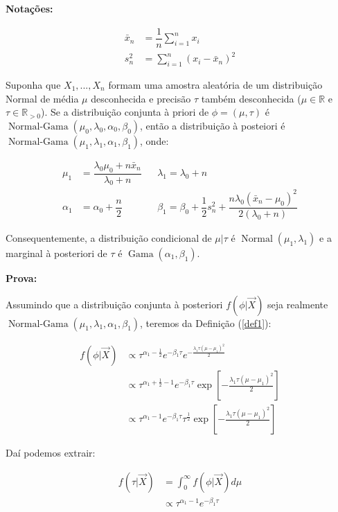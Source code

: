 \documentclass[a4paper]{article}
\newcommand{\op}[1]{{\operatorname{#1}}}
\newcommand{\vX}{\vec X}
\newcommand{\xn}{\bar{x}_n}
\newcommand{\sn}{s^2_n}
\begin{document}
\textbf{Notações:}

\begin{align*}
\xn&=\dfrac{1}{n}\sum_{i=1}^{n}x_i\\
\sn&=\sum_{i=1}^{n}(x_i-\xn)^2
\end{align*}
\begin{theorem}
	\label{theo1}
	\citep{degroot2012probability}
	Suponha que $X_1,. . . ,X_n$ formam uma amostra aleatória de um distribuição Normal de média $\mu$ desconhecida e precisão $\tau$ também desconhecida ($\mu\in\mathbb{R}$ e $\tau\in\mathbb{R}_{>0}$). Se a distribuição conjunta à priori de $\phi=(\mu,\tau)$ é $\op{Normal-Gama}(\mu_0,\lambda_0,\alpha_0,\beta_0)$, então a distribuição à posteiori é $\op{Normal-Gama}(\mu_1,\lambda_1,\alpha_1,\beta_1)$, onde:
	
	\begin{align*}
	\mu_1&=\dfrac{\lambda_0\mu_0+n\xn}{\lambda_0+n}&&\lambda_1=\lambda_0+n\\
	\alpha_1&=\alpha_0+\dfrac n 2&&\beta_1=\beta_0+\dfrac12\sn+\dfrac{n\lambda_0(\xn-\mu_0)^2}{2(\lambda_0+n)}
	\end{align*}
	
	Consequentemente, a distribuição condicional de $\mu|\tau$ é $\op{Normal}(\mu_1,\lambda_1)$ e a marginal à posteriori de $\tau$ é $\op{Gama}(\alpha_1,\beta_1)$.
\end{theorem}

\textbf{Prova:}

Assumindo que a distribuição conjunta à posteriori $f(\phi|\vX)$ seja realmente $\op{Normal-Gama}(\mu_1,\lambda_1,\alpha_1,\beta_1)$, teremos da Definição (\ref{def1}):

\begin{align*}f(\phi|\vX)&\displaystyle\propto\tau^{\alpha_1-\frac12}e^{-\beta_1\tau}e^{-\frac{\lambda_1\tau (\mu-\mu_1)^2}2}\\
&\propto \tau^{\alpha_1+\frac12-1}e^{-\beta_1\tau}\exp{\left[-\frac{\lambda_1\tau (\mu-\mu_1)^2}2\right]}\\
&\propto\tau^{\alpha_1-1}e^{-\beta_1\tau}\tau^{\frac12}\exp{\left[-\frac{\lambda_1\tau (\mu-\mu_1)^2}2\right]}
\end{align*}

Daí podemos extrair:

\begin{align}
	f(\tau|\vX)&=\displaystyle\int_0^{\infty}f(\phi|\vX)d\mu\nonumber\\
	&\propto \tau^{\alpha_1-1}e^{-\beta_1\tau}\label{marg_tau}
\end{align}
\end{document}
